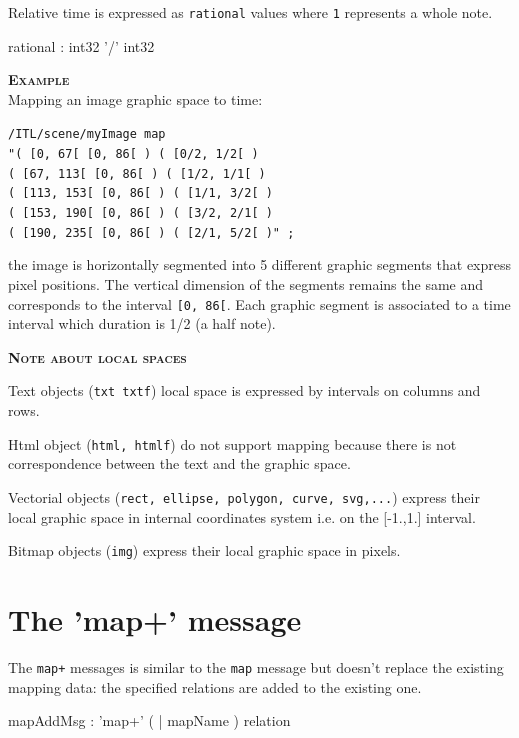 \documentclass[a4paper,twoside]{report}
\newcommand{\sublevel}[1]	{\section{#1}}
\newcommand{\OSC}[1]		{\texttt{#1}}
\newcommand{\values}[1]		{\texttt{#1}}
\newcommand{\example}		{\textbf{\hspace{-1.5cm}\textbf{\textsc{Example }}}}
\newcommand{\note}	[1]		{\vspace{2mm}\textbf{\hspace{-1.03cm}\textbf{\textsc{Note #1}}}}
\let\olditemize\itemize
\let\oldenditemize\enditemize
\renewenvironment{itemize} 	{\olditemize \setlength{\itemsep}{1mm}}{\oldenditemize}
\newcommand{\sample}	[1]			{\vspace{-2mm}\begin{center}\colorbox{mygrey}{
								\begin{minipage}[t]{0.9\columnwidth} 
								{\small \texttt{#1}}
								\end{minipage}}\end{center}}
\begin{document}
Relative time is expressed as \OSC{rational} values where \values{1} represents a whole note.

\begin{rail}
rational : int32 '/' int32
\end{rail}

\example \\
Mapping an image graphic space to time:
\sample{/ITL/scene/myImage map \\
\hspace*{1cm}"( [0, 67[    [0, 86[ ) ( [0/2, 1/2[ ) \\
\hspace*{1.15cm}( [67, 113[  [0, 86[ ) ( [1/2, 1/1[ ) \\
\hspace*{1.15cm}( [113, 153[ [0, 86[ ) ( [1/1, 3/2[ ) \\
\hspace*{1.15cm}( [153, 190[ [0, 86[ ) ( [3/2, 2/1[ ) \\
\hspace*{1.15cm}( [190, 235[ [0, 86[ ) ( [2/1, 5/2[ )" ;
}
the image is horizontally segmented into 5 different graphic segments that express pixel positions. The vertical dimension of the segments remains the same and corresponds to the interval \values{[0, 86[}. Each graphic segment is associated to a time interval which duration is 1/2 (a half note).

\note{about local spaces}
\begin{itemize}
\item Text objects (\OSC{txt txtf}) local space is expressed by intervals on columns and rows.
\item Html object (\OSC{html, htmlf}) do not support mapping because there is not correspondence between the text and the graphic space.
\item Vectorial objects (\OSC{rect, ellipse, polygon, curve, svg,...}) express their local graphic space in internal coordinates system i.e. on the [-1.,1.] interval.
\item Bitmap objects (\OSC{img}) express their local graphic space in pixels.
\end{itemize}


\sublevel{The 'map+' message}
\label{mapAddMsg}
The \OSC{map+} messages is similar to the \OSC{map} message but doesn't replace the existing mapping data: the specified relations are added to the existing one.

\begin{rail}
mapAddMsg : 'map+' ( | mapName ) relation
\end{rail}
\end{document}
